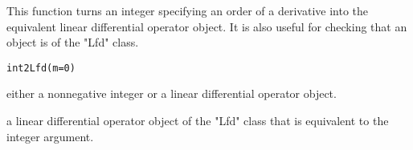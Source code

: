 \documentclass{article}
\begin{document}
\begin{Description}\relax
This function turns an integer specifying an order of a derivative into the
equivalent linear differential operator object.  It is also useful for
checking that an object is of the "Lfd" class.
\end{Description}
\begin{Usage}
\begin{verbatim}
int2Lfd(m=0)
\end{verbatim}
\end{Usage}
\begin{Arguments}
\begin{ldescription}
\item[\code{m}] either a nonnegative integer or a linear differential operator object.

\end{ldescription}
\end{Arguments}
\begin{Value}
a linear differential operator object of the "Lfd" class that is
equivalent to the integer argument.
\end{Value}
\end{document}
